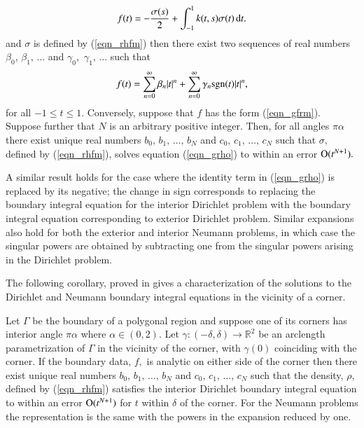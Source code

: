 \begin{theorem}
\begin{align}
f(t) = -\frac{\sigma(s)}{2} +\int_{-1}^1 k(t,s)  \sigma(t)\,{\rm d}t.
\label{eqn_grho}
\end{align}
and $\sigma$ is defined by (\ref{eqn_rhfm}) then there exist two sequences of real numbers $\beta_0$, $\beta_1,\,\dots$ and $\gamma_0,$ $\gamma_1,\,\dots$ such that
\begin{align}
f(t) = \sum_{n=0}^\infty\beta_n |t|^n + \sum_{n=0}^\infty \gamma_n {\rm sgn}(t) |t|^n,
\label{eqn_gfrm}
\end{align}
for all $-1 \le t \le 1.$ Conversely, suppose that $f$ has the form (\ref{eqn_gfrm}). Suppose further that $N$ is an arbitrary positive integer. Then, for all angles $\pi \alpha$ there exist unique real numbers $b_0,\,b_1,\,\dots,\,b_N$ and $c_0,\,c_1,\,\dots,\,c_N$ such that $\sigma,$ defined by (\ref{eqn_rhfm}), solves equation  (\ref{eqn_grho}) to within an error ${\rm O}(t^{N+1}).$ 
\end{theorem}

\begin{remark}
A similar result holds for the case where the identity term in (\ref{eqn_grho}) is replaced by its negative; the change in sign corresponds to replacing the boundary integral equation for the interior Dirichlet problem with the boundary integral equation corresponding to exterior Dirichlet problem. Similar expansions also hold for both the exterior and interior Neumann problems, in which case the singular powers are obtained by subtracting one from the singular powers arising in the Dirichlet problem.
\end{remark}


The following corollary, proved in \cite{serkhacha} gives a characterization of the solutions to the Dirichlet and Neumann boundary integral equations in the vicinity of a corner.

\begin{corollary}
Let $\Gamma$ be the boundary of a polygonal region and suppose one of its corners has interior angle $\pi \alpha$ where $\alpha \in (0,2).$ Let $\gamma:(-\delta,\delta) \rightarrow \mathbb{R}^2$ be an arclength parametrization of $\Gamma$ in the vicinity of the corner, with $\gamma(0)$ coinciding with the corner. If the boundary data, $f,$ is analytic on either side of the corner then there exist unique real numbers $b_0,\,b_1,\,\dots,\,b_N$ and $c_0,\,c_1,\,\dots,\,c_N$ such that the density, $\rho,$ defined by (\ref{eqn_rhfm}) satisfies the interior Dirichlet boundary integral equation to within an error ${\rm O}(t^{N+1})$ for $t$ within $\delta$ of the corner. For the Neumann problems the representation is the same with the powers in the expansion reduced by one.
\end{corollary}
